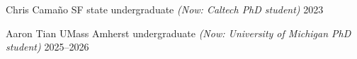 


\begin{cvhonors}
\cvhonor
    {Chris Cama\~no} %
    {SF state undergraduate \emph{(Now: Caltech PhD student)}} %
    {} %
    {2023} %

\cvhonor
    {Aaron Tian} %
    {UMass Amherst undergraduate \emph{(Now: University of Michigan PhD student)}} %
    {} %
    {2025--2026} %

    
\end{cvhonors}
